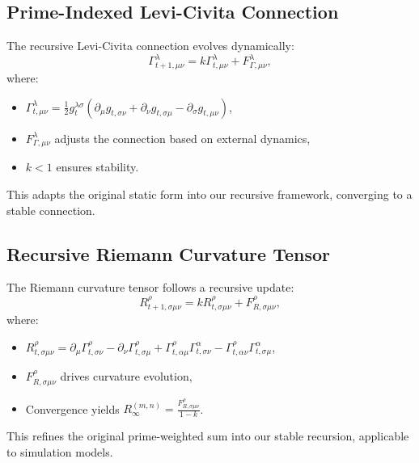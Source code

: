 \documentclass{article}
\theoremstyle{plain}
\begin{document}
\subsection{Prime-Indexed Levi-Civita Connection}
The recursive Levi-Civita connection evolves dynamically:
\begin{equation}
    \Gamma_{t+1,\mu\nu}^\lambda = k \Gamma_{t,\mu\nu}^\lambda + F_{\Gamma,\mu\nu}^\lambda,
\end{equation}
where:
\begin{itemize}
    \item \( \Gamma_{t,\mu\nu}^\lambda = \frac{1}{2} g_{t}^{\lambda\sigma} (\partial_\mu g_{t,\sigma\nu} + \partial_\nu g_{t,\sigma\mu} - \partial_\sigma g_{t,\mu\nu}) \),
    \item \( F_{\Gamma,\mu\nu}^\lambda \) adjusts the connection based on external dynamics,
    \item \( k < 1 \) ensures stability.
\end{itemize}
This adapts the original static form into our recursive framework, converging to a stable connection.

\subsection{Recursive Riemann Curvature Tensor}
The Riemann curvature tensor follows a recursive update:
\begin{equation}
    R_{t+1,\sigma\mu\nu}^\rho = k R_{t,\sigma\mu\nu}^\rho + F_{R,\sigma\mu\nu}^\rho,
\end{equation}
where:
\begin{itemize}
    \item \( R_{t,\sigma\mu\nu}^\rho = \partial_\mu \Gamma_{t,\sigma\nu}^\rho - \partial_\nu \Gamma_{t,\sigma\mu}^\rho + \Gamma_{t,\alpha\mu}^\rho \Gamma_{t,\sigma\nu}^\alpha - \Gamma_{t,\alpha\nu}^\rho \Gamma_{t,\sigma\mu}^\alpha \),
    \item \( F_{R,\sigma\mu\nu}^\rho \) drives curvature evolution,
    \item Convergence yields \( R_\infty^{(m,n)} = \frac{F_{R,\sigma\mu\nu}^\rho}{1 - k} \).
\end{itemize}
This refines the original prime-weighted sum into our stable recursion, applicable to simulation models.
\end{document}

